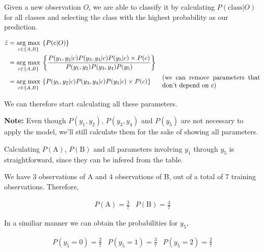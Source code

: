 \documentclass[12pt]{article}
\begin{document}
\begin{enumerate}[leftmargin=\labelsep]
\begin{enumerate}
          Given a new observation $O$, we are able to classify it by calculating $P(\text{class}|O)$ for all classes and selecting the class with the
          highest probability as our prediction.

          \begin{equation}\label{ex1-map}
              \begin{aligned}
                  \hat{z} & = \underset{c \in \{A, B\}}{\text{arg max}} \medspace \left\{P(\text{c} | O)\right\}  \\
                          & = \underset{c \in \{A, B\}}{\text{arg max}} \medspace \left\{\frac{P(y_1, y_2 | c) P(y_3, y_4 | c) P(y_5 | c) \times P(c)}{P(y_1, y_2) P(y_3, y_4) P(y_5)}\right\} \\
                          & = \underset{c \in \{A, B\}}{\text{arg max}} \medspace \left\{P(y_1, y_2 | c) P(y_3, y_4 | c) P(y_5 | c) \times P(c)\right\}
                          & \parbox{15em}{(we can remove parameters that don't depend on $c$)}
              \end{aligned}
          \end{equation}

          We can therefore start calculating all these parameters.

          \textbf{Note:} Even though $P(y_1, y_2)$, $P(y_3, y_4)$ and $P(y_5)$ are not necessary
          to apply the model, we'll still calculate them for the sake of showing
          all parameters.

          Calculating $P(\text{A})$, $P(\text{B})$ and all parameters involving $y_1$ through
          $y_5$ is straightforward, since they can be infered from the table.

          We have 3 observations of A and 4 observations of B, out of a total of 7 training observations.
          Therefore,

          \[
              \begin{array}{cc}
                  P(\text{A}) = \frac{3}{7} &
                  P(\text{B}) = \frac{4}{7}
              \end{array}
          \]

          In a similiar manner we can obtain the probabilities for $y_5$,

          \[
              \begin{array}{ccc}
                  P(y_5 = 0) = \frac{2}{7} &
                  P(y_5 = 1) = \frac{3}{7} &
                  P(y_5 = 2) = \frac{2}{7}
              \end{array}
          \]


\end{enumerate}
\end{enumerate}
\end{document}
